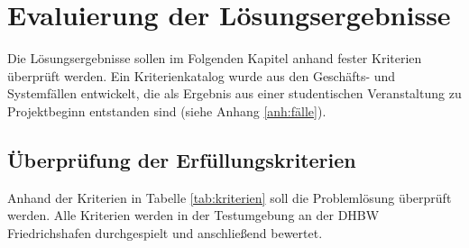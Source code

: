 \section{Evaluierung der Lösungsergebnisse}
Die Lösungsergebnisse sollen im Folgenden Kapitel anhand fester Kriterien überprüft werden. Ein Kriterienkatalog wurde aus den Geschäfts- und Systemfällen entwickelt, die als Ergebnis aus einer studentischen Veranstaltung zu Projektbeginn entstanden sind (siehe Anhang \ref{anh:fälle}).
\subsection{Überprüfung der Erfüllungskriterien}\label{ssec:erfuellung}
Anhand der Kriterien in Tabelle \ref{tab:kriterien} soll die Problemlösung überprüft werden. Alle Kriterien werden in der Testumgebung an der DHBW Friedrichshafen durchgespielt und anschließend bewertet.
